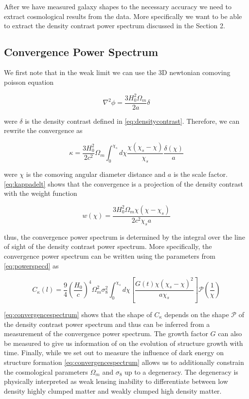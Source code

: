 After we have measured galaxy shapes to the necessary accuracy we need to extract cosmological results from the data. More specifically we want to be able to extract the density contrast power spectrum discussed in the Section 2. 

\subsection{Convergence Power Spectrum}
We first note that in the weak limit we can use the 3D newtonian comoving poisson equation

\begin{equation}
    \nabla^2 \phi = \frac{3H_0 ^2\Omega_m }{2a} \delta
    \label{eq:poisson}
\end{equation}

were $\delta$ is the density contrast defined in \autoref{eq:densitycontrast}. Therefore, we can rewrite the convergence as

\begin{equation}
    \kappa = \frac{3H_0^2}{2c^2} \Omega_m \int_{0}^{\chi_s} d\chi  \frac{\chi (\chi_s-\chi)}{\chi_s} \frac{\delta(\chi)}{a}
    \label{eq:kappadelt}
\end{equation}

were $\chi$ is the comoving angular diameter distance and $a$ is the scale factor. \autoref{eq:kappadelt} shows that the convergence is a projection of the density contrast with the weight function 

\begin{equation}
    w(\chi) = \frac{3H_0^2 \Omega_m \chi (\chi - \chi_s)}{2 c^2 \chi_s a}
    \label{eq:weight}
\end{equation}

thus, the convergence power spectrum is determined by the integral over the line of sight of the density contrast power spectrum\cite{Hoekstra:2013gua,rachel_2018,Bartelmann:2016dvf}. More specifically, the convergence power spectrum can be written using the parameters from \autoref{eq:powerspecd} as 

\begin{equation}
    C_\kappa(l) = \frac{9}{4} \left(\frac{H_0}{c}\right)^4\Omega_m^2 \sigma_8^2 \int^{\chi_s}_0 d \chi \left[\frac{G(t)\chi (\chi_s-\chi)^2}{a \chi_s}\right] \mathcal{P}\left(\frac{1}{\chi}\right)
    \label{eq:convergencespectrum}
\end{equation}

\autoref{eq:convergencespectrum} shows that the shape of $C_\kappa$ depends on the shape $\mathcal{P}$ of the density contrast power spectrum and thus can be inferred from a measurement of the convergence power spectrum. The growth factor $G$ can also be measured to give us information of on the evolution of structure growth with time. Finally, while we set out to measure the influence of dark energy on structure formation \autoref{eq:convergencespectrum} allows us to additionally constrain the cosmological parameters $\Omega_m$ and $\sigma_8$ up to a degeneracy. The degeneracy is physically interpreted as weak lensing inability to differentiate between low density highly clumped matter and weakly clumped high density matter. 


